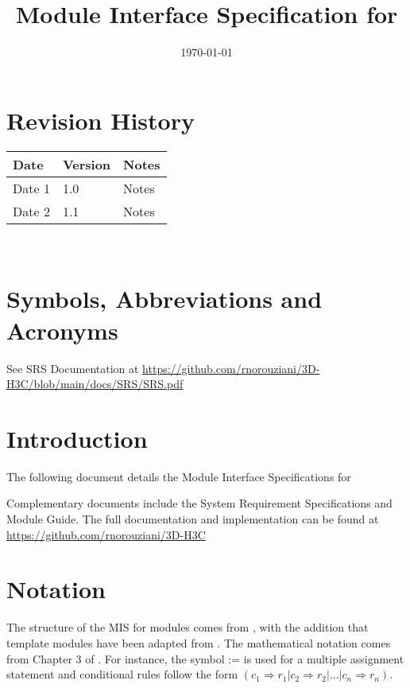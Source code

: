 \documentclass[12pt, titlepage]{article}
\begin{document}
\title{Module Interface Specification for \progname{}}

\author{\authname}

\date{\today}

\maketitle


\section{Revision History}

\begin{tabularx}{\textwidth}{p{3cm}p{2cm}X}
\toprule {\bf Date} & {\bf Version} & {\bf Notes}\\
\midrule
Date 1 & 1.0 & Notes\\
Date 2 & 1.1 & Notes\\
\bottomrule
\end{tabularx}

~\newpage

\section{Symbols, Abbreviations and Acronyms}

See SRS Documentation at \url{https://github.com/rnorouziani/3D-H3C/blob/main/docs/SRS/SRS.pdf}

\newpage

\tableofcontents

\newpage


\section{Introduction}

The following document details the Module Interface Specifications for \progname{}

Complementary documents include the System Requirement Specifications
and Module Guide.  The full documentation and implementation can be
found at \url{https://github.com/rnorouziani/3D-H3C}

\section{Notation}

The structure of the MIS for modules comes from \citet{HoffmanAndStrooper1995},
with the addition that template modules have been adapted from
\cite{GhezziEtAl2003}.  The mathematical notation comes from Chapter 3 of
\citet{HoffmanAndStrooper1995}.  For instance, the symbol := is used for a
multiple assignment statement and conditional rules follow the form $(c_1
\Rightarrow r_1 | c_2 \Rightarrow r_2 | ... | c_n \Rightarrow r_n )$.
\end{document}
